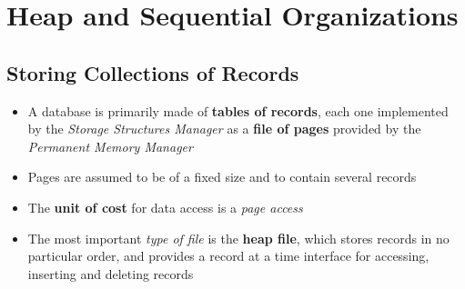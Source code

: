 \chapter{Heap and Sequential Organizations}

\section{Storing Collections of Records}
\begin{itemize}
    \item A database is primarily made of \textbf{tables of records}, each one implemented by the \textit{Storage Structures Manager} as a \textbf{file of pages} provided by the \textit{Permanent Memory Manager}
    \item Pages are assumed to be of a fixed size and to contain several records
    \item The \textbf{unit of cost} for data access is a \textit{page access}
    \item The most important \textit{type of file} is the \textbf{heap file}, which stores records in no particular order, and provides a record at a time interface for accessing, inserting and deleting records
\end{itemize}

